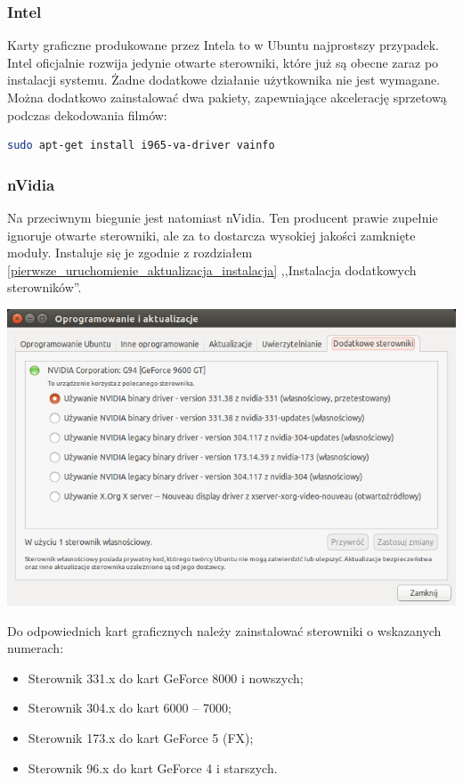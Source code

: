 \subsubsection{Intel}
Karty graficzne produkowane przez Intela to w Ubuntu najprostszy przypadek. Intel oficjalnie rozwija jedynie otwarte sterowniki, które już są obecne zaraz po instalacji systemu. Żadne dodatkowe działanie użytkownika nie jest wymagane. Można dodatkowo zainstalować dwa pakiety, zapewniające akcelerację sprzetową podczas dekodowania filmów:

\begin{lstlisting}[language=bash]
sudo apt-get install i965-va-driver vainfo
\end{lstlisting}

\subsubsection{nVidia}
Na przeciwnym biegunie jest natomiast nVidia. Ten producent prawie zupełnie ignoruje otwarte sterowniki, ale za to dostarcza wysokiej jakości zamknięte moduły. Instaluje się je zgodnie z rozdziałem \ref{pierwsze_uruchomienie_aktualizacja_instalacja} ,,Instalacja dodatkowych sterowników''. 

\begin{center}
	\includegraphics[width=\linewidth]{images/pierwsze_uruchomienie_driver2.png}
\end{center}

Do odpowiednich kart graficznych należy zainstalować sterowniki o wskazanych numerach:
\begin{itemize}
\item Sterownik 331.x do kart GeForce 8000 i nowszych;
\item Sterownik 304.x do kart 6000 -- 7000;
\item Sterownik 173.x do kart GeForce 5 (FX);
\item Sterownik 96.x do kart GeForce 4 i starszych.
\end{itemize}


